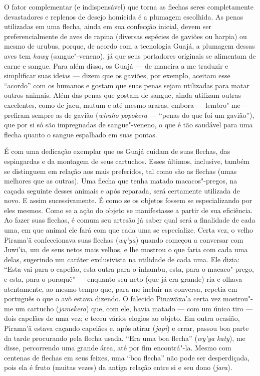 O fator complementar (e indispensável) que torna as flechas seres
completamente devastadores e replenos de desejo homicida é a plumagem
escolhida. As penas utilizadas em uma flecha, ainda em sua confecção
inicial, devem ser preferencialmente de aves de rapina (diversas
espécies de gaviões ou harpia) ou mesmo de urubus, porque, de acordo com
a tecnologia Guajá, a plumagem dessas aves tem \emph{hawy}
(sangue"-veneno), já que seus portadores originais se alimentam de carne
e sangue. Para além disso, os Guajá --- de maneira a me traduzir e
simplificar suas ideias --- dizem que os gaviões, por exemplo, aceitam
esse ``acordo'' com os humanos e gostam que suas penas sejam utilizadas
para matar outros animais. Além das penas que gostam de sangue, ainda
utilizam outras excelentes, como de jacu, mutum e até mesmo araras,
embora --- lembro"-me --- prefiram sempre as de gavião (\emph{wiraho}
\emph{popokera} --- ``penas do que foi um gavião''), que por si só são
impregnadas de sangue"-veneno, o que é tão saudável para uma flecha
quanto o sangue espalhado em suas pontas.

É com uma dedicação exemplar que os Guajá cuidam de suas flechas, das
espingardas e da montagem de seus cartuchos. Esses últimos, inclusive,
também se distinguem em relação aos mais preferidos, tal como são as
flechas (umas melhores que as outras). Uma flecha que tenha matado
macacos"-pregos, na caçada seguinte desses animais e após reparada, será
certamente utilizada de novo. E assim sucessivamente. É como se os
objetos fossem se especializando por eles mesmos. Como se a ação do
objeto se manifestasse a partir de sua eficiência. Ao fazer suas
flechas, é comum seu artesão já saber qual será a finalidade de cada
uma, em que animal ele fará com que cada uma se especialize. Certa vez,
o velho Pirama'ã confeccionava suas flechas (\emph{wy'ya}) quando
começou a conversar com Juwi'ia, um de seus netos mais velhos, e lhe
mostrou o que faria com cada uma delas, sugerindo um caráter
exclusivista na utilidade de cada uma. Ele dizia: ``Esta vai para o
capelão, esta outra para o inhambu, esta, para o macaco"-prego, e esta,
para o poraquê'' --- enquanto seu neto (que já era grande) ria e olhava
atentamente, ao mesmo tempo que, para me incluir na conversa, repetia em
português o que o avô estava dizendo. O falecido Pinawãxa'a certa vez
mostrou"-me um cartucho (\emph{jamekera}) que, com ele, havia matado ---
com um único tiro --- dois capelães de uma vez; e teceu vários elogios ao
objeto. Em outra ocasião, Pirama'ã estava caçando capelães e, após
atirar (\emph{japi}) e errar, passou boa parte da tarde procurando pela
flecha usada. ``Era uma boa flecha'' (\emph{wy'ya} \emph{katy}), me disse,
percorrendo uma grande área, até por fim encontrá"-la. Mesmo com centenas
de flechas em seus feixes, uma ``boa flecha'' não pode ser desperdiçada,
pois ela é fruto (muitas vezes) da antiga relação entre si e seu dono
(\emph{jara}).

